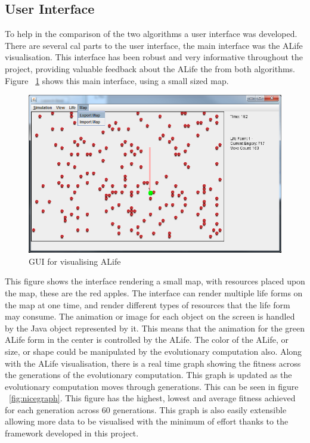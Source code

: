 \documentclass[12pt]{article}
\begin{document}
\subsection{User Interface}
To help in the comparison of the two algorithms a user interface was developed. There are several cal parts to the user interface, the main
interface was the ALife visualisation. This interface has been robust and very informative throughout the project, providing valuable
feedback about the ALife the from both algorithms. Figure ~\ref{fig:interface1} shows this main interface, using a small sized map.

\begin{figure} [ht]
\centering
\includegraphics[scale = 0.45]{smallvis.png}
\caption{GUI for visualising ALife}
\label{fig:interface1}
\end{figure}

This figure shows the interface rendering a small map, with resources placed upon the map, these are the red apples. The interface can
render multiple life forms on the map at one time, and render different types of resources that the life form may consume. The animation
or image for each object on the screen is handled by the Java object represented by it. This means that the animation for the green
ALife form in the center is controlled by the ALife. The color of the ALife, or size, or shape could be manipulated by the evolutionary
computation also. Along with the ALife visualisation, there is a real time graph showing the fitness  across the generations of the 
evolutionary computation. This graph is updated as the evolutionary computation moves through generations. This can be seen in figure
~\ref{fig:nicegraph}. This figure has the highest, lowest and average fitness achieved for each generation across 60 generations. This
graph is also easily extensible allowing more data to be visualised with the minimum of effort thanks to the framework developed in
this project.
\end{document}
